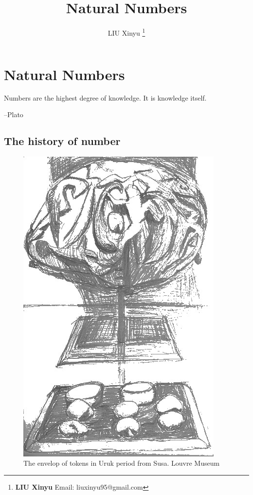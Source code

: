 \documentclass[UTF8]{article}
\begin{document}
\title{Natural Numbers}

\author{LIU Xinyu
\thanks{{\bfseries LIU Xinyu} \newline
  Email: liuxinyu95@gmail.com \newline}
  }

\maketitle
\fi


\ifx\wholebook\relax
\chapter{Natural Numbers}
\fi

\epigraph{Numbers are the highest degree of knowledge. It is knowledge itself.}{--Plato}

\section{The history of number}

\begin{figure}
 \centering
 \includegraphics[scale=0.38]{img/clay-envelope.jpg}
 \caption{The envelop of tokens in Uruk period from Susa. Louvre Museum}
 \label{fig:clay-token}
\end{figure}
\end{document}
